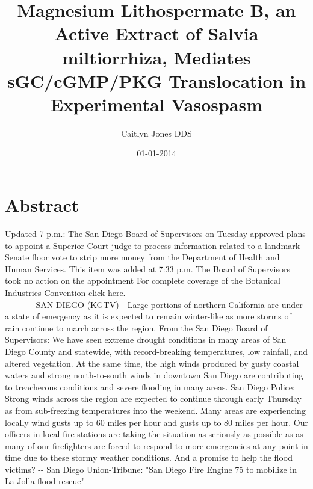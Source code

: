 \documentclass{article}%
\title{Magnesium Lithospermate B, an Active Extract of Salvia miltiorrhiza, Mediates sGC/cGMP/PKG Translocation in Experimental Vasospasm}%
\author{Caitlyn Jones DDS}%
\affil{School of Medicine, Chung Shan Medical University, 110 Chien{-}Kuo N. Road, Section 1, Taichung 402, Taiwan}%
\date{01{-}01{-}2014}%
\begin{document}
%
\normalsize%
\maketitle%
\section{Abstract}%
\label{sec:Abstract}%
Updated 7 p.m.: The San Diego Board of Supervisors on Tuesday approved plans to appoint a Superior Court judge to process information related to a landmark Senate floor vote to strip more money from the Department of Health and Human Services.\newline%
This item was added at 7:33 p.m. The Board of Supervisors took no action on the appointment\newline%
For complete coverage of the Botanical Industries Convention click here.\newline%
{-}{-}{-}{-}{-}{-}{-}{-}{-}{-}{-}{-}{-}{-}{-}{-}{-}{-}{-}{-}{-}{-}{-}{-}{-}{-}{-}{-}{-}{-}{-}{-}{-}{-}{-}{-}{-}{-}{-}{-}{-}{-}{-}{-}{-}{-}{-}{-}{-}{-}{-}{-}{-}{-}{-}{-}{-}{-}{-}{-}{-}{-}{-}{-}{-}{-}{-}{-}{-}{-}{-}{-}{-}\newline%
SAN DIEGO (KGTV) {-} Large portions of northern California are under a state of emergency as it is expected to remain winter{-}like as more storms of rain continue to march across the region.\newline%
From the San Diego Board of Supervisors:\newline%
We have seen extreme drought conditions in many areas of San Diego County and statewide, with record{-}breaking temperatures, low rainfall, and altered vegetation. At the same time, the high winds produced by gusty coastal waters and strong north{-}to{-}south winds in downtown San Diego are contributing to treacherous conditions and severe flooding in many areas.\newline%
San Diego Police:\newline%
Strong winds across the region are expected to continue through early Thursday as from sub{-}freezing temperatures into the weekend. Many areas are experiencing locally wind gusts up to 60 miles per hour and gusts up to 80 miles per hour. Our officers in local fire stations are taking the situation as seriously as possible as as many of our firefighters are forced to respond to more emergencies at any point in time due to these stormy weather conditions.\newline%
And a promise to help the flood victims?\newline%
{-}{-} San Diego Union{-}Tribune: "San Diego Fire Engine 75 to mobilize in La Jolla flood rescue"
\end{document}
